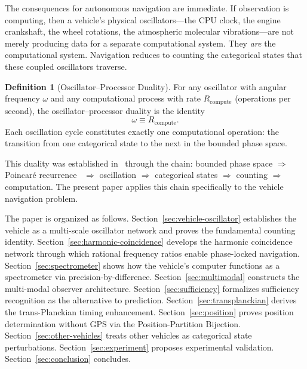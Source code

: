 \documentclass[twocolumn,10pt]{article}
\theoremstyle{definition}
\newtheorem{definition}[theorem]{Definition}
\theoremstyle{remark}
\begin{document}
The consequences for autonomous navigation are immediate. If observation is
computing, then a vehicle's physical oscillators---the CPU clock, the engine
crankshaft, the wheel rotations, the atmospheric molecular vibrations---are
not merely producing data for a separate computational system. They \emph{are}
the computational system. Navigation reduces to counting the categorical
states that these coupled oscillators traverse.

\begin{definition}[Oscillator--Processor Duality]\label{def:osc-proc-duality}
For any oscillator with angular frequency $\omega$ and any computational
process with rate $R_{\mathrm{compute}}$ (operations per second), the
oscillator--processor duality is the identity
\begin{equation}\label{eq:osc-proc}
  \omega \equiv R_{\mathrm{compute}}.
\end{equation}
Each oscillation cycle constitutes exactly one computational operation: the
transition from one categorical state to the next in the bounded phase space.
\end{definition}

This duality was established in~\cite{sachikonye2026poincare} through the
chain: bounded phase space $\Rightarrow$ Poincar\'e
recurrence~\cite{poincare1890} $\Rightarrow$ oscillation $\Rightarrow$
categorical states $\Rightarrow$ counting $\Rightarrow$ computation. The
present paper applies this chain specifically to the vehicle navigation
problem.

The paper is organized as follows. Section~\ref{sec:vehicle-oscillator}
establishes the vehicle as a multi-scale oscillator network and proves the
fundamental counting identity. Section~\ref{sec:harmonic-coincidence}
develops the harmonic coincidence network through which rational frequency
ratios enable phase-locked navigation. Section~\ref{sec:spectrometer} shows
how the vehicle's computer functions as a spectrometer via
precision-by-difference. Section~\ref{sec:multimodal} constructs the
multi-modal observer architecture. Section~\ref{sec:sufficiency} formalizes
sufficiency recognition as the alternative to prediction.
Section~\ref{sec:transplanckian} derives the trans-Planckian timing
enhancement. Section~\ref{sec:position} proves position determination
without GPS via the Position-Partition Bijection.
Section~\ref{sec:other-vehicles} treats other vehicles as categorical state
perturbations. Section~\ref{sec:experiment} proposes experimental validation.
Section~\ref{sec:conclusion} concludes.
\end{document}
